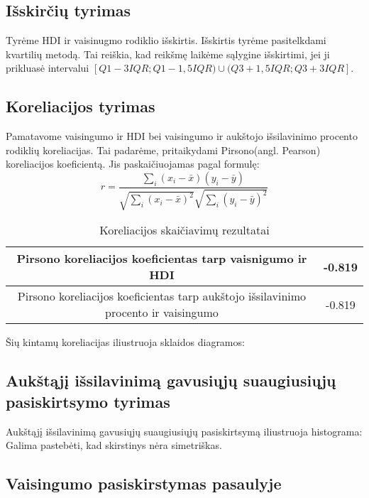 \subsection{Išskirčių tyrimas}
Tyrėme HDI ir vaisinugmo rodiklio išskirtis.
Išskirtis tyrėme pasitelkdami kvartilių metodą. Tai reiškia, kad reikšmę laikėme sąlygine išskirtimi, jei ji prikluasė intervalui $[Q1-3IQR; Q1-1,5IQR) \cup (Q3+1,5IQR; Q3+3IQR]$.

\subsection{Koreliacijos tyrimas}
Pamatavome vaisingumo ir HDI bei vaisingumo ir aukštojo išsilavinimo procento rodiklių koreliacijas. Tai padarėme, pritaikydami Pirsono(angl. Pearson) koreliacijos koeficientą. Jis paskaičiuojamas pagal formulę: 
\begin{equation}
r = \frac{\sum\limits_i (x_i - \bar{x})(y_i - \bar{y})}{\sqrt{\sum\limits_i(x_i - \bar{x})^2}\sqrt{\sum\limits_i(y_i - \bar{y})^2}}
\end{equation}

\begin{table}[h!]
\begin{center}
    \begin{tabular}{|c|c|}
        \hline
        Pirsono koreliacijos koeficientas tarp vaisnigumo ir HDI & -0.819 \\\hline
        Pirsono koreliacijos koeficientas tarp aukštojo išsilavinimo procento ir vaisingumo & -0.819 \\\hline
    \end{tabular}
    \caption{Koreliacijos skaičiavimų rezultatai}
\end{center}
\end{table}

Šių kintamų koreliacijas iliustruoja sklaidos diagramos:

\subsection{Aukštąjį išsilavinimą gavusiųjų suaugiusiųjų pasiskirtsymo tyrimas} 

Aukštąjį išsilavinimą gavusiųjų suaugiusiųjų pasiskirtsymą iliustruoja histograma: \\

Galima pastebėti, kad skirstinys nėra simetriškas.

\subsection{Vaisingumo pasiskirstymas pasaulyje}
